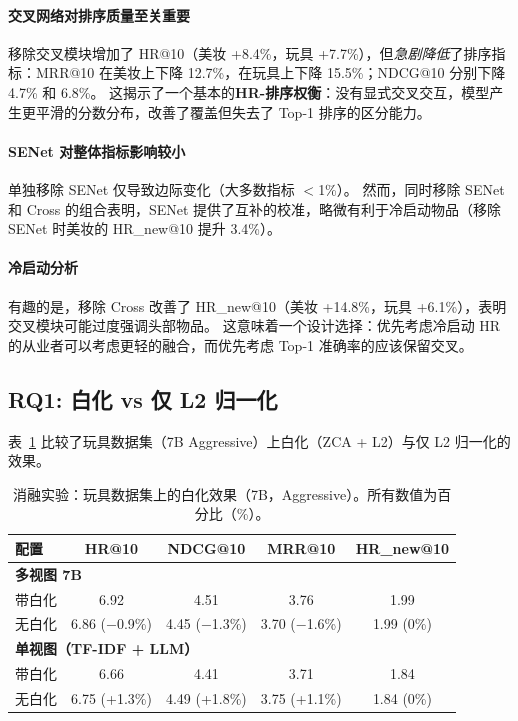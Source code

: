 \documentclass[sigconf,natbib=true]{acmart}
\begin{document}
\paragraph{交叉网络对排序质量至关重要}
移除交叉模块增加了 HR@10（美妆 +8.4\%，玩具 +7.7\%），但\emph{急剧降低}了排序指标：MRR@10 在美妆上下降 12.7\%，在玩具上下降 15.5\%；NDCG@10 分别下降 4.7\% 和 6.8\%。
这揭示了一个基本的\textbf{HR-排序权衡}：没有显式交叉交互，模型产生更平滑的分数分布，改善了覆盖但失去了 Top-1 排序的区分能力。

\paragraph{SENet 对整体指标影响较小}
单独移除 SENet 仅导致边际变化（大多数指标 $<$1\%）。
然而，同时移除 SENet 和 Cross 的组合表明，SENet 提供了互补的校准，略微有利于冷启动物品（移除 SENet 时美妆的 HR\_new@10 提升 3.4\%）。

\paragraph{冷启动分析}
有趣的是，移除 Cross 改善了 HR\_new@10（美妆 +14.8\%，玩具 +6.1\%），表明交叉模块可能过度强调头部物品。
这意味着一个设计选择：优先考虑冷启动 HR 的从业者可以考虑更轻的融合，而优先考虑 Top-1 准确率的应该保留交叉。

\subsection{RQ1: 白化 vs 仅 L2 归一化}

表~\ref{tab:ablation_whiten} 比较了玩具数据集（7B Aggressive）上白化（ZCA + L2）与仅 L2 归一化的效果。

\begin{table}[t]
\caption{消融实验：玩具数据集上的白化效果（7B，Aggressive）。所有数值为百分比（\%）。}
\label{tab:ablation_whiten}
\centering
\small
\begin{tabular}{lcccc}
\toprule
\textbf{配置} & HR@10 & NDCG@10 & MRR@10 & HR\_new@10 \\
\midrule
\multicolumn{5}{l}{\textbf{多视图 7B}} \\
带白化 & 6.92 & 4.51 & 3.76 & 1.99 \\
无白化 & 6.86 ($-$0.9\%) & 4.45 ($-$1.3\%) & 3.70 ($-$1.6\%) & 1.99 (0\%) \\
\midrule
\multicolumn{5}{l}{\textbf{单视图（TF-IDF + LLM）}} \\
带白化 & 6.66 & 4.41 & 3.71 & 1.84 \\
无白化 & 6.75 (+1.3\%) & 4.49 (+1.8\%) & 3.75 (+1.1\%) & 1.84 (0\%) \\
\bottomrule
\end{tabular}
\end{table}
\end{document}
